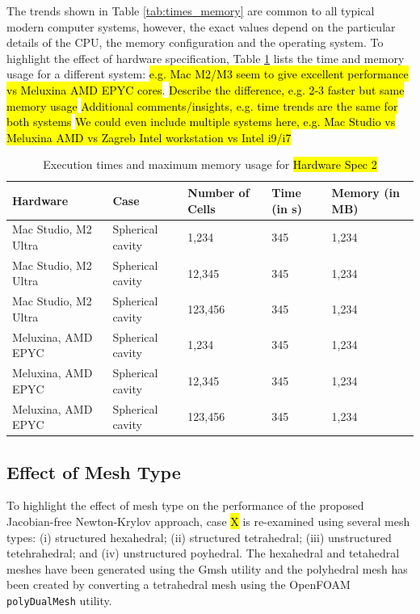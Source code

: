 \documentclass[sn-mathphys,Numbered]{sn-jnl}%
\begin{document}
The trends shown in Table \ref{tab:times_memory} are common to all typical modern computer systems, however, the exact values depend on the particular details of the CPU, the memory configuration and the operating system.
To highlight the effect of hardware specification, Table \ref{tab:times_memory_spec2} lists the time and memory usage for a different system: \hl{e.g. Mac M2/M3 seem to give excellent performance vs Meluxina AMD EPYC cores}.
\hl{Describe the difference, e.g. 2-3 faster but same memory usage}
\hl{Additional comments/insights, e.g. time trends are the same for both systems}
\hl{We could even include multiple systems here, e.g. Mac Studio vs Meluxina AMD vs Zagreb Intel workstation vs Intel i9/i7}
\begin{table}[htb]
	\centering
		\begin{tabular}{lllll}
			\hline
			Hardware & Case & Number of Cells & Time (in s) & Memory (in MB) \\
			\hline 
			Mac Studio, M2 Ultra & Spherical cavity & 1,234 & 345 & 1,234  \\
			Mac Studio, M2 Ultra & Spherical cavity & 12,345 & 345 & 1,234  \\
			Mac Studio, M2 Ultra & Spherical cavity & 123,456 & 345 & 1,234  \\
			Meluxina, AMD EPYC & Spherical cavity & 1,234 & 345 & 1,234  \\
			Meluxina, AMD EPYC & Spherical cavity & 12,345 & 345 & 1,234  \\
			Meluxina, AMD EPYC & Spherical cavity & 123,456 & 345 & 1,234  \\
			\hline
		\end{tabular}
	\caption{Execution times and maximum memory usage for \hl{Hardware Spec 2}}
	\label{tab:times_memory_spec2}
\end{table}


\subsection{Effect of Mesh Type}
To highlight the effect of mesh type on the performance of the proposed Jacobian-free Newton-Krylov approach, case \hl{X} is re-examined using several mesh types:
(i) structured hexahedral; (ii) structured tetrahedral; (iii) unstructured tetehrahedral; and (iv) unstructured poyhedral.
The hexahedral and tetahedral meshes have been generated using the Gmsh utility \citep{geuzaine2009gmsh} and the polyhedral mesh has been created by converting a tetrahedral mesh using the OpenFOAM \texttt{polyDualMesh} utility.
\end{document}
